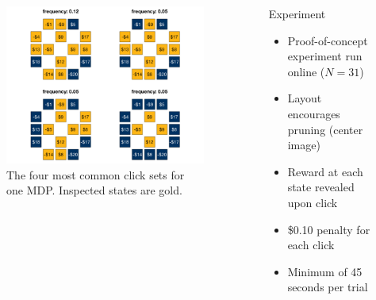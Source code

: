 \documentclass[final]{beamer}
\newlength{\sepwid}
\newlength{\onecolwid}
\newlength{\twocolwid}
\begin{document}
\begin{frame}[t, fragile]
\begin{columns}[t]
\begin{column}{\twocolwid}
\begin{columns}[t,totalwidth=\twocolwid]
\begin{column}{\onecolwid}
        \begin{figure}
          \centering
          \label{fig:click_sets}
          \includegraphics[width=0.9\linewidth]{figs/click_sets_trial4_noFB_small.png}
          \caption{The four most common click sets for one MDP. Inspected states are gold.}
        \end{figure}
    
    \end{column} %

  \end{columns}

\end{column} %
\begin{column}{\sepwid}\end{column} %
\begin{column}{\onecolwid} %

  \begin{block}{Experiment}\label{experiment}
    \begin{itemize}
      \item Proof-of-concept experiment run online ($N=31$)
      \item Layout encourages pruning (center image)
      \item Reward at each state revealed upon click
      \item \$0.10 penalty for each click
      \item Minimum of 45 seconds per trial
    \end{itemize}
  \end{block}


\end{column}
\end{columns}
\end{frame}
\end{document}
